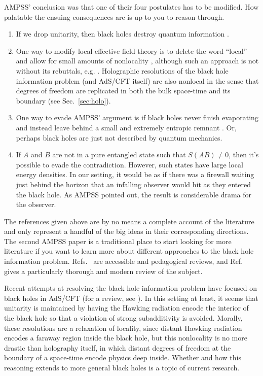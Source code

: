 \documentclass[a4paper,11pt]{article}
\renewcommand{\Ref}[1]{Ref.~\cite{#1}}
\newcommand{\Sec}[1]{Sec.~\ref{#1}}
\begin{document}
AMPSS' conclusion was that one of their four postulates has to be modified.
How palatable the ensuing consequences are is up to you to reason through.
\begin{enumerate}
\item If we drop unitarity, then black holes destroy quantum information \cite{Unruh:2017uaw}.
\item One way to modify local effective field theory is to delete the word ``local'' and allow for small amounts of nonlocality \cite{Giddings:2012gc}, although such an approach is not without its rebuttals, e.g. \cite[Sec.~8]{Raju:2020smc}.
Holographic resolutions of the black hole information problem (and AdS/CFT itself) are also nonlocal in the sense that degrees of freedom are replicated in both the bulk space-time and its boundary (see \Sec{sec:holo}).
\item One way to evade AMPSS' argument is if black holes never finish evaporating and instead leave behind a small and extremely entropic remnant \cite{Chen:2014jwq}.
Or, perhaps black holes are just not described by quantum mechanics.
\item If $A$ and $B$ are not in a pure entangled state such that $S(AB) \neq 0$, then it's possible to evade the contradiction.
However, such states have large local energy densities.
In our setting, it would be as if there was a firewall waiting just behind the horizon that an infalling observer would hit as they entered the black hole.
As AMPSS pointed out, the result is considerable drama for the observer.
\end{enumerate}
The references given above are by no means a complete account of the literature and only represent a handful of the big ideas in their corresponding directions.
The second AMPSS paper \cite{Almheiri:2013hfa} is a traditional place to start looking for more literature if you want to learn more about different approaches to the black hole information problem.
Refs.~\cite{Mathur:2009hf,Harlow:2014yka,Polchinski:2016hrw} are accessible and pedagogical reviews, and \Ref{Raju:2020smc} gives a particularly thorough and modern review of the subject.

Recent attempts at resolving the black hole information problem have focused on black holes in AdS/CFT (for a review, see \cite{Almheiri:2020cfm}).
In this setting at least, it seems that unitarity is maintained by having the Hawking radiation encode the interior of the black hole so that a violation of strong subadditivity is avoided.
Morally, these resolutions are a relaxation of locality, since distant Hawking radiation encodes a faraway region inside the black hole, but this nonlocality is no more drastic than holography itself, in which distant degrees of freedom at the boundary of a space-time encode physics deep inside.
Whether and how this reasoning extends to more general black holes is a topic of current research.
\end{document}
